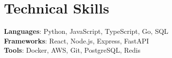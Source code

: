 \documentclass[letterpaper,11pt]{article}
\begin{document}
\section{Technical Skills}
 \begin{itemize}[leftmargin=0.15in, label={}]
    \small{\item{
     \textbf{Languages}{: Python, JavaScript, TypeScript, Go, SQL} \\
     \textbf{Frameworks}{: React, Node.js, Express, FastAPI} \\
     \textbf{Tools}{: Docker, AWS, Git, PostgreSQL, Redis}
    }}
 \end{itemize}

\end{document}
